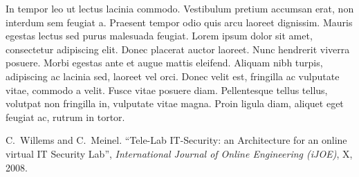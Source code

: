 \documentclass[a4paper,12pt,pagesize,headsepline,bibtotoc,titlepage]{scrartcl}
\begin{document}
In tempor leo ut lectus lacinia commodo. Vestibulum pretium accumsan erat, non interdum sem feugiat a. Praesent tempor odio quis arcu laoreet dignissim. Mauris egestas lectus sed purus malesuada feugiat. Lorem ipsum dolor sit amet, consectetur adipiscing elit. Donec placerat auctor laoreet. Nunc hendrerit viverra posuere. Morbi egestas ante et augue mattis eleifend. Aliquam nibh turpis, adipiscing ac lacinia sed, laoreet vel orci. Donec velit est, fringilla ac vulputate vitae, commodo a velit. Fusce vitae posuere diam. Pellentesque tellus tellus, volutpat non fringilla in, vulputate vitae magna. Proin ligula diam, aliquet eget feugiat ac, rutrum in tortor.



\newpage
\begin{thebibliography}{1}

C.~Willems and C.~Meinel.
``Tele-Lab IT-Security: an Architecture for an online virtual IT Security Lab'',
\emph{International Journal of Online Engineering (iJOE)},
X, 2008.

\end{thebibliography}
\end{document}
